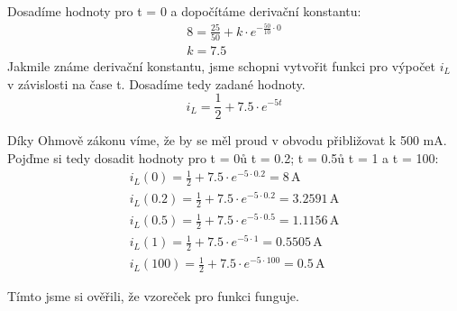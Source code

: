 Dosadíme hodnoty pro t = 0 a dopočítáme derivační konstantu:
\nopagebreak
\[
\begin{array}{l}
8 = \frac{25}{50} + k \cdot e^{-\frac{50}{10} \cdot 0} \\
k = 7.5
\end{array}
\]
\newpage
Jakmile známe derivační konstantu, jsme schopni vytvořit funkci pro výpočet \( i_L \) v závislosti na čase t.
Dosadíme tedy zadané hodnoty.
\nopagebreak
\[
i_L = \frac{1}{2} + 7.5 \cdot e^{-5t}
\]

Díky Ohmově zákonu víme, že by se měl proud v obvodu přibližovat k 500 mA.
Pojďme si tedy dosadit hodnoty pro t = 0ů t = 0.2; t = 0.5ů t = 1 a t = 100:
\nopagebreak
\[
\begin{array}{l}
i_L(0) = \frac{1}{2} + 7.5 \cdot e^{-5 \cdot 0.2} = 8 \, \mathrm{A} \\
i_L(0.2) = \frac{1}{2} + 7.5 \cdot e^{-5 \cdot 0.2} = 3.2591 \, \mathrm{A} \\
i_L(0.5) = \frac{1}{2} + 7.5 \cdot e^{-5 \cdot 0.5} = 1.1156 \, \mathrm{A} \\
i_L(1) = \frac{1}{2} + 7.5 \cdot e^{-5 \cdot 1} = 0.5505 \, \mathrm{A} \\
i_L(100) = \frac{1}{2} + 7.5 \cdot e^{-5 \cdot 100} = 0.5 \, \mathrm{A}
\end{array}
\]

Tímto jsme si ověřili, že vzoreček pro funkci funguje.